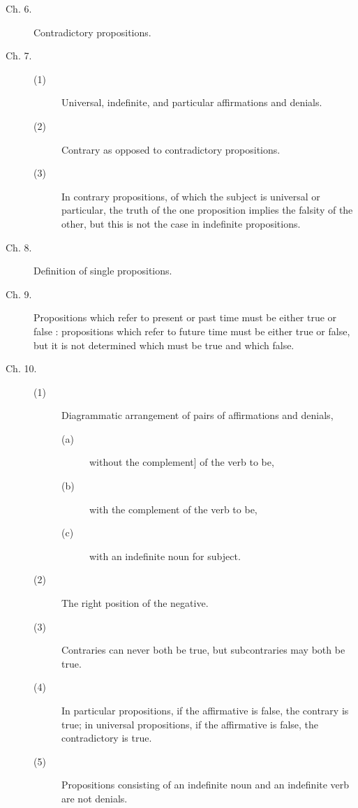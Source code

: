 \begin{description}
\item[Ch. 6.]
Contradictory propositions. 

\item[Ch. 7.]
\begin{description}
\item[(1)] Universal, indefinite, and particular affirmations and 
denials. 

\item[(2)] Contrary as opposed to contradictory propositions. 

\item[(3)] In contrary propositions, of which the subject is universal 
or particular, the truth of the one proposition implies the 
falsity of the other, but this is not the case in indefinite 
propositions. 
\end{description}

\item[Ch. 8.]
Definition of single propositions. 

\item[Ch. 9.] Propositions which refer to present or past time must be 
either true or false : propositions which refer to future time must 
be either true or false, but it is not determined which must be true 
and which false. 

\item[Ch. 10.]
\begin{description}
 \item[(1)] Diagrammatic arrangement of pairs of affirmations and 
denials,
\begin{description}
\item[(a)] without the complement] of the verb to be,
\item[(b)] with the complement of the verb to be,
\item[(c)] with an indefinite noun for subject. 
\end{description}

\item[(2)] The right position of the negative. 

\item[(3)] Contraries can never both be true, but subcontraries may both be true. 

\item[(4)] In particular propositions, if the affirmative is false, the contrary 
is true; in universal propositions, if the affirmative is false, the 
contradictory is true. 

\item[(5)] Propositions consisting of an indefinite noun and an indefinite 
verb are not denials. 


\end{description}
\end{description}
